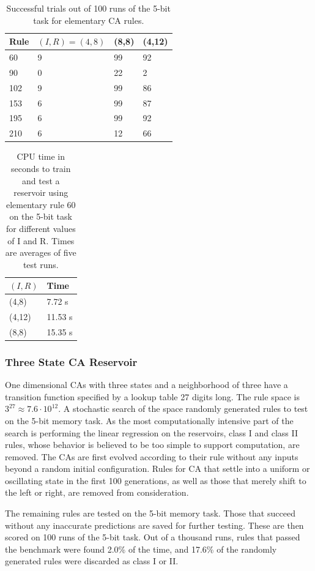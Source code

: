 \documentclass{elsarticle}
\begin{document}
\begin{multicols}{2}
\begin{table}[H] \centering
\begin{tabular}{|l|l|l|l|}
\hline
\textbf{Rule} & \boldmath$(I,R)=(4,8)$ & \textbf{(8,8)} & \textbf{(4,12)} \\ 
\hline
60 & 9 & 99 & 92 \\ \hline
90 & 0 & 22 & 2  \\ \hline
102 & 9 & 99 & 86 \\ \hline
153 & 6 & 99 & 87 \\ \hline
195 & 6 & 99 & 92 \\ \hline
210 & 6 & 12 & 66 \\ \hline
\end{tabular}
\caption{Successful trials out of 100 runs of the 5-bit task for elementary CA 
   rules.}
\label{table:elementary}
\end{table}

\begin{table}[H] \centering
\begin{tabular}{|l|l|}
\hline
\boldmath$(I,R)$ & \textbf{Time} \\ \hline
(4,8) & 7.72 s \\ \hline
(4,12) & 11.53 s \\ \hline
(8,8) & 15.35 s \\ \hline
\end{tabular}
\caption{CPU time in seconds to train and test a reservoir using elementary 
   rule 60 on the 5-bit task for different values of I and R. Times are 
      averages of five test runs.}
\label{table:time}
\end{table}

  
\subsubsection{Three State CA Reservoir}
One dimensional CAs with three states and a neighborhood of three have a 
transition function specified by a lookup table 27 digits long. The rule space 
is $3^{27} \approx 7.6 \cdot 10^{12}$. A stochastic search of the space 
randomly generated rules to test on the 5-bit memory task. As the most 
computationally intensive part of the search is performing the linear 
regression on the reservoirs, class I and class II rules, whose behavior is 
believed to be too simple to support computation, are removed. The CAs are 
first evolved according to their rule without any inputs beyond a random 
initial configuration. Rules for CA that settle into a uniform or oscillating 
state in the first 100 generations, as well as those that merely shift to the 
left or right, are removed from consideration.\par
The remaining rules are tested on the 5-bit memory task.  Those that succeed 
without any inaccurate predictions are saved for further testing.  These are 
then scored on 100 runs of the 5-bit task.  Out of a thousand runs, rules that 
passed the benchmark were found 2.0\% of the time, and 17.6\% of the randomly 
generated rules were discarded as class I or II.
    

\end{multicols}
\end{document}
